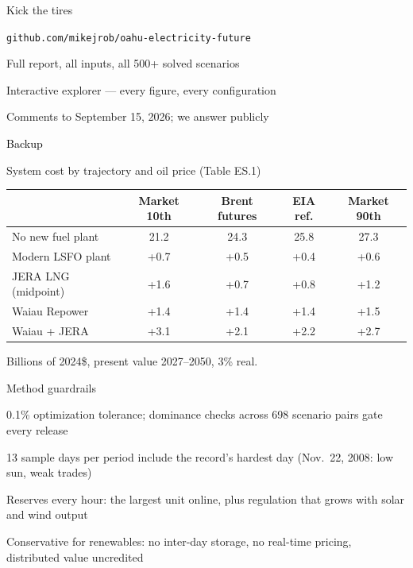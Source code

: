 \documentclass[11pt,aspectratio=169]{beamer}
\begin{document}
\begin{frame}{Kick the tires}
\begin{center}
  {\Large \texttt{github.com/mikejrob/oahu-electricity-future}}
\end{center}
\vspace{0.3cm}
\begin{wideitemize}
  \item Full report, all inputs, all 500+ solved scenarios
  \item Interactive explorer --- every figure, every configuration
  \item Comments to September 15, 2026; we answer publicly
\end{wideitemize}
\end{frame}

\appendix
\beginbackup
\begin{transitionframe}
  \begin{center}{\Huge \textcolor{black}{Backup}}\end{center}
\end{transitionframe}

\begin{frame}{System cost by trajectory and oil price (Table ES.1)}
\begin{center}
\small
\renewcommand{\arraystretch}{1.25}
\begin{tabular}{lcccc}
\toprule
 & Market 10th & Brent futures & EIA ref. & Market 90th \\
\midrule
No new fuel plant       & 21.2 & 24.3 & 25.8 & 27.3 \\
Modern LSFO plant       & +0.7 & +0.5 & +0.4 & +0.6 \\
JERA LNG (midpoint)     & +1.6 & +0.7 & +0.8 & +1.2 \\
Waiau Repower           & +1.4 & +1.4 & +1.4 & +1.5 \\
Waiau + JERA            & +3.1 & +2.1 & +2.2 & +2.7 \\
\bottomrule
\end{tabular}

\vspace{0.3cm}
Billions of 2024\$, present value 2027--2050, 3\% real.
\end{center}
\end{frame}

\begin{frame}{Method guardrails}
\begin{wideitemize}
  \item 0.1\% optimization tolerance; dominance checks across 698
        scenario pairs gate every release
  \item 13 sample days per period include the record's hardest day
        (Nov.\ 22, 2008: low sun, weak trades)
  \item Reserves every hour: the largest unit online, plus regulation
        that grows with solar and wind output
  \item Conservative for renewables: no inter-day storage, no real-time
        pricing, distributed value uncredited
\end{wideitemize}
\end{frame}
\end{document}
